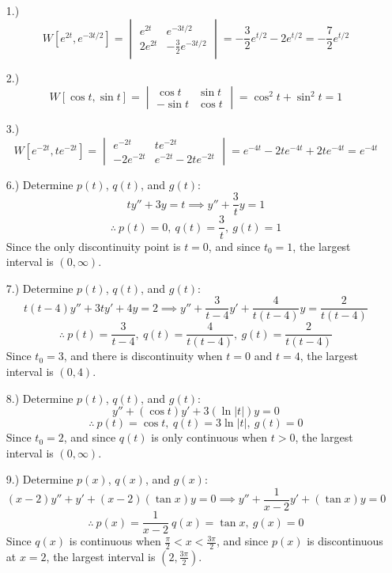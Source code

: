 \documentclass[12pt]{article}
\newcommand{\bracks}[1]{\left[#1\right]}
\newcommand{\parns}[1]{\left(#1\right)}
\begin{document}
\pagestyle{fancy}
\fancyhead{}

\normalsize
\begin{itemize}
    \item[1.)] \[W\bracks{e^{2t},e^{-3t/2}}=\begin{vmatrix}
        e^{2t} & e^{-3t/2} \\
        2e^{2t} & -\frac{3}{2}e^{-3t/2}
    \end{vmatrix}=-\frac{3}{2}e^{t/2}-2e^{t/2}=-\frac{7}{2}e^{t/2}\]

    \item[2.)] \[W\bracks{\cos t,\sin t}=\begin{vmatrix}
        \cos t & \sin t \\
        -\sin t & \cos t
    \end{vmatrix}=\cos^2t+\sin^2t=1\]

    \item[3.)] \[W\bracks{e^{-2t},te^{-2t}}=\begin{vmatrix}
        e^{-2t} & te^{-2t} \\
        -2e^{-2t} & e^{-2t}-2te^{-2t}
    \end{vmatrix}=e^{-4t}-2te^{-4t}+2te^{-4t}=e^{-4t}\]

    \item[6.)] Determine $p(t)$, $q(t)$, and $g(t)$:
    \[ty''+3y=t\implies y''+\frac{3}{t}y=1\]
    \[\therefore\ p(t)=0,\ q(t)=\frac{3}{t},\ g(t)=1\]
    Since the only discontinuity point is $t=0$, and since $t_0=1$, the largest interval is $(0,\infty)$.

    \item[7.)] Determine $p(t)$, $q(t)$, and $g(t)$:
    \[t(t-4)y''+3ty'+4y=2\implies y''+\frac{3}{t-4}y'+\frac{4}{t(t-4)}y=\frac{2}{t(t-4)}\]
    \[\therefore\ p(t)=\frac{3}{t-4},\ q(t)=\frac{4}{t(t-4)},\ g(t)=\frac{2}{t(t-4)}\]
    Since $t_0=3$, and there is discontinuity when $t=0$ and $t=4$, the largest interval is $(0,4)$.

    \item[8.)] Determine $p(t)$, $q(t)$, and $g(t)$:
    \[y''+(\cos t)y'+3(\ln\vert t\vert)y=0\]
    \[\therefore\ p(t)=\cos t,\ q(t)=3\ln\vert t\vert,\ g(t)=0\]
    Since $t_0=2$, and since $q(t)$ is only continuous when $t>0$, the largest interval is $(0,\infty)$.

    \item[9.)] Determine $p(x)$, $q(x)$, and $g(x)$:
    \[(x-2)y''+y'+(x-2)(\tan x)y=0\implies y''+\frac{1}{x-2}y'+(\tan x)y=0\]
    \[\therefore\ p(x)=\frac{1}{x-2}\ q(x)=\tan x,\ g(x)=0\]
    Since $q(x)$ is continuous when $\frac{\pi}{2}<x<\frac{3\pi}{2}$, and since $p(x)$ is discontinuous at $x=2$, the largest interval is $\parns{2,\frac{3\pi}{2}}$.
\end{itemize}
\end{document}
